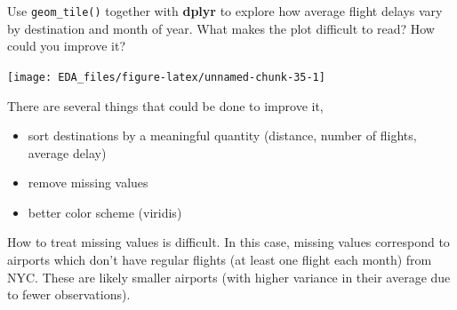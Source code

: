 \documentclass[]{book}
\newenvironment{Shaded}{\begin{snugshade}}{\end{snugshade}}
\newcommand{\DataTypeTok}[1]{\textcolor[rgb]{0.13,0.29,0.53}{#1}}
\newcommand{\KeywordTok}[1]{\textcolor[rgb]{0.13,0.29,0.53}{\textbf{#1}}}
\newcommand{\NormalTok}[1]{#1}
\newcommand{\OperatorTok}[1]{\textcolor[rgb]{0.81,0.36,0.00}{\textbf{#1}}}
\newcommand{\OtherTok}[1]{\textcolor[rgb]{0.56,0.35,0.01}{#1}}
\newcommand{\StringTok}[1]{\textcolor[rgb]{0.31,0.60,0.02}{#1}}
\providecommand{\tightlist}{%
  \setlength{\itemsep}{0pt}\setlength{\parskip}{0pt}}
\theoremstyle{plain}
\theoremstyle{remark}
\begin{document}
Use \texttt{geom\_tile()} together with \textbf{dplyr} to explore how average flight delays vary by destination and month of year.
What makes the plot difficult to read?
How could you improve it?

\begin{Shaded}
\end{Shaded}

\begin{center}\texttt{[image: EDA\_files/figure-latex/unnamed-chunk-35-1]} \end{center}

There are several things that could be done to improve it,

\begin{itemize}
\tightlist
\item
  sort destinations by a meaningful quantity (distance, number of flights, average delay)
\item
  remove missing values
\item
  better color scheme (viridis)
\end{itemize}

How to treat missing values is difficult.
In this case, missing values correspond to airports which don't have regular flights (at least one flight each month) from NYC.
These are likely smaller airports (with higher variance in their average due to fewer observations).
\end{document}
